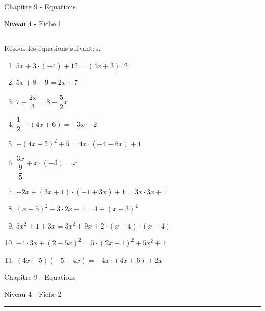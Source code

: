 \documentclass[12pt,parskip=half-, twoside=semi]{scrartcl}
\begin{document}
\newpage


  
\begin{center}
   \bfseries
    \begin{Huge}
      Chapitre 9 - Equations
    \end{Huge}
    \smallbreak
    \begin{large}
      Niveau 4  - Fiche 1
    \end{large}
    \smallbreak
    \rule[10pt]{.5\linewidth}{1 pt}
  \end{center}
  \setcounter{exercise}{0}

\begin{exercise}
  Résous les équations suivantes.
    \begin{enumerate}[itemsep=0.4cm]
        \item $5 x+3 \cdot(-4)+12=(4 x+3) \cdot 2$
        \item $5 x+8-9=2 x+7$
        \item $7+\dfrac{2 x}{3}=8-\dfrac{5}{2} x$
        \item $\dfrac{1}{2}-(4 x+6)=-3 x+2$
        \item $-(4 x+2)^2+5=4 x \cdot(-4-6 x)+1$
        \item $\dfrac{3 x}{\dfrac{9}{5}}+x \cdot(-3)=x$
        \item $-2 x+(3 x+1) \cdot(-1+3 x)+1=3 x \cdot 3 x+1$
        \item $(x+5)^2+3 \cdot 2 x-1=4+(x-3)^2$
        \item $5 x^2+1+3 x=3 x^2+9 x+2 \cdot(x+4) \cdot(x-4)$
        \item $-4 \cdot 3 x+(2-5 x)^2=5 \cdot(2 x+1)^2+5 x^2+1$
        \item $(4 x-5)(-5-4 x)=-4 x \cdot(4 x+6)+2 x$
      \end{enumerate}
\end{exercise}


\newpage


\begin{center}
  \bfseries
  \begin{Huge}
    Chapitre 9 - Equations
  \end{Huge}
  \smallbreak
  \begin{large}
    Niveau 4  - Fiche 2
  \end{large}
  \smallbreak
  \rule[10pt]{.5\linewidth}{1 pt}
\end{center}
\setcounter{exercise}{0}
\end{document}
